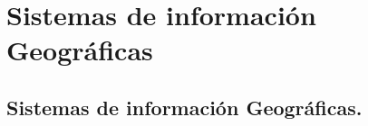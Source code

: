 \chapter{Sistemas de información Geográficas}
\label{chap3}
\ifpdf
    \graphicspath{{Chapter3/Chapter3Figs/PNG/}{Chapter3/Chapter3Figs/PDF/}{Chapter3/Chapter3Figs/}}
\else
    \graphicspath{{Chapter3/Chapter3Figs/EPS/}{Chapter3/Chapter3Figs/}}
\fi


\section{Sistemas de información Geográficas.}
\label{sec:procOpt}

